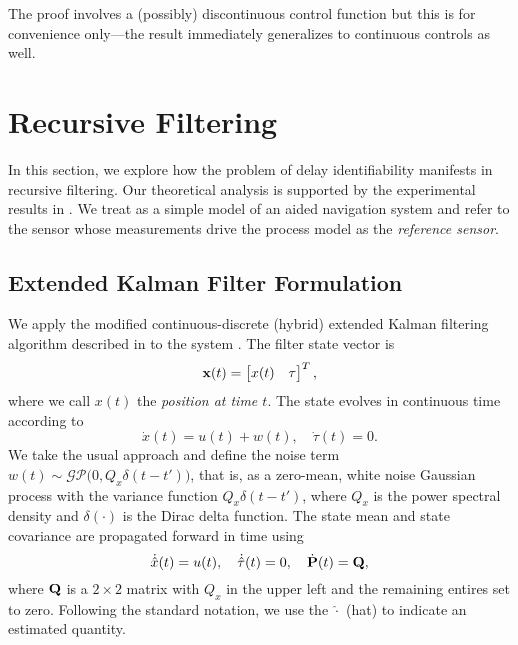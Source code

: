 \documentclass[letterpaper,10pt,conference]{ieeeconf}
\theoremstyle{definition}
\begin{document}
The proof involves a (possibly) discontinuous control function but this is for convenience only---the result immediately generalizes to continuous controls as well.

\section{Recursive Filtering}
\label{sec:filter}

In this section, we explore how the problem of delay identifiability manifests in recursive filtering. 
%
Our theoretical analysis is supported by the experimental results in .
%
We treat  as a simple model of an aided navigation system and refer to the sensor whose measurements drive the process model as the \emph{reference sensor}.

\subsection{Extended Kalman Filter Formulation}
\label{subsec:ekf}

We apply the modified continuous-discrete (hybrid) extended Kalman filtering algorithm described in \cite{2014_Li_Online} to the system .
%
The filter state vector is
%
\begin{equation}
\label{eqn:state_vector}
\boldsymbol{\mathbf{x}}(t) = \begin{bmatrix} x(t) & \tau \end{bmatrix}^{T},
\end{equation}
%
where we call $x(t)$ the \emph{position at time $t$}.
%
The state evolves in continuous time according to
%
\begin{equation}
\label{eqn:dynamics}
\dot{x}(t) = u(t) + w(t),\quad 
\dot{\tau}(t) = 0.
\end{equation}
%
We take the usual approach and define the noise term $w(t) \sim \mathcal{GP}\big(0, Q_{x}\delta(t - t')\big)$, that is, as a zero-mean, white noise Gaussian process with the variance function $Q_{x}\delta(t - t')$, where $Q_{x}$ is the power spectral density and $\delta(\cdot)$ is the Dirac delta function.
%
The state mean and state covariance are propagated forward in time using
%
\begin{equation}
\dot{\hat{x}}(t) = u(t),\quad
\dot{\hat{\tau}}(t) = 0,\quad
\dot{\boldsymbol{\mathbf{P}}}(t) = \boldsymbol{\mathbf{Q}},
\end{equation}
% 
where $\boldsymbol{\mathbf{Q}}$ is a $2 \times 2$ matrix with $Q_{x}$ in the upper left and the remaining entires set to zero. Following the standard notation, we use the $\hat{\cdot}$ (hat) to indicate an estimated quantity.
\end{document}

